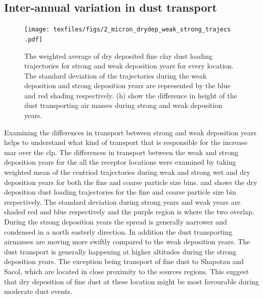 \subsection{Inter-annual variation in dust transport}
\begin{figure}[htbp]
    \centering
    \texttt{[image: texfiles/figs/2\_micron\_drydep\_weak\_strong\_trajecs .pdf]}
    \caption{The weighted average of dry deposited fine clay dust loading trajectories for strong and weak deposition years for every location. The standard deviation of the trajectories during the weak deposition and strong deposition years are represented by the blue and red shading respectively.  (h) show the difference in height of the dust transporting air masses during strong and weak deposition years. }
    \label{fig:strong_weak_drydepo_year_2mmu_trajecs}
\end{figure}

Examining the differences in transport between strong and weak deposition years helps to understand what kind of transport that is responsible for the increase \acrshort{mar} over the \acrshort{clp}. The differences in transport between the weak and strong deposition years for the all the receptor locations were examined by taking weighted mean of the centriod trajectories during weak and strong wet and dry deposition years for both the fine and coarse particle size bins. 
 and  shows the dry deposition dust loading trajectories for the fine and coarse particle size bin respectively. 
The standard deviation during strong years and weak years are shaded red and blue respectively and the purple region is where the two overlap. During the strong deposition years the spread is generally narrower and condensed in a north easterly direction.  In addition the dust transporting airmasses are moving more swiftly compared to the weak deposition years. 
The dust transport is generally happening at higher altitudes during the strong deposition years. The exception being transport of fine dust to Shapotau and Sacol, which are located in close proximity to the sources regions. This suggest that dry deposition of fine dust at these location might be most favourable during moderate dust events.


